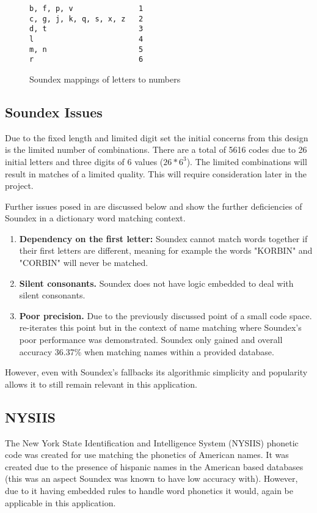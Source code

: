 \begin{figure}[h!]
    \centering
    \begin{BVerbatim}
b, f, p, v               1
c, g, j, k, q, s, x, z   2
d, t                     3
l                        4
m, n                     5
r                        6
    \end{BVerbatim}

    \caption{Soundex mappings of letters to numbers}
    \label{fig:soundexMap}
\end{figure}

\subsection{Soundex Issues}
\label{sec:soundexIssues}

Due to the fixed length and limited digit set the initial concerns from this design is the limited number of combinations. There are a total of 5616 codes due to 26 initial letters and three digits of 6 values ($26 * 6^3$).
The limited combinations will result in matches of a limited quality. This will require consideration later in the project.

Further issues posed in \cite{patman2001soundex} are discussed below and show the further deficiencies of Soundex in a dictionary word matching context. 

\begin{enumerate}
    \item \textbf{Dependency on the first letter:} Soundex cannot match words together if their first letters are different, meaning for example the words "KORBIN" and "CORBIN" will never be matched.

    \item \textbf{Silent consonants.} Soundex does not have logic embedded to deal with silent consonants.

    \item \textbf{Poor precision.} Due to the previously discussed point of a small code space. \cite{patman2001soundex} re-iterates this point but in the context of name matching where Soundex's poor performance was demonstrated. Soundex only gained and overall accuracy 36.37\% when matching names within a provided database.
\end{enumerate}

However, even with Soundex's fallbacks its algorithmic simplicity and popularity allows it to still remain relevant in this application.

\subsection{NYSIIS}
The New York State Identification and Intelligence System (NYSIIS) phonetic code was created for use matching the phonetics of American names. It was created due to the presence of hispanic names in the American based databases (this was an aspect Soundex was known to have low accuracy with). However, due to it having embedded rules to handle word phonetics it would, again be applicable in this application.

